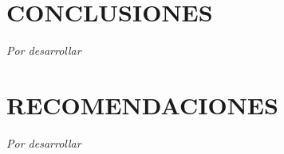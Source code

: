 \section{CONCLUSIONES}

\textit{Por desarrollar}

\section{RECOMENDACIONES}

\textit{Por desarrollar}
